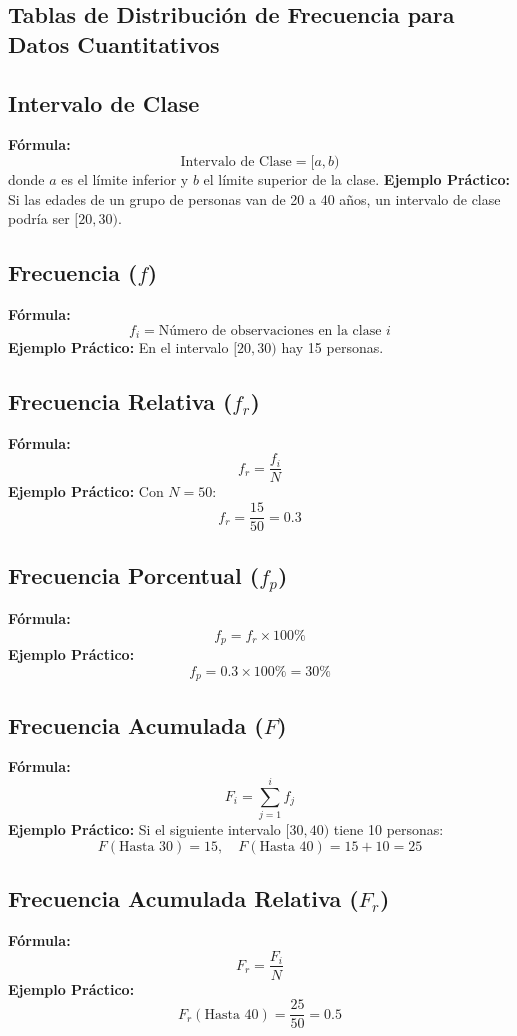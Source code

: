 \documentclass[10pt]{article}
\begin{document}
\begin{multicols}{2}
		\section*{Tablas de Distribución de Frecuencia para Datos Cuantitativos}
		
		\subsection*{Intervalo de Clase}
		\textbf{Fórmula:}
		\[
		\text{Intervalo de Clase} = [a, b)
		\]
		donde \( a \) es el límite inferior y \( b \) el límite superior de la clase.
		\textbf{Ejemplo Práctico:}  
		Si las edades de un grupo de personas van de 20 a 40 años, un intervalo de clase podría ser \([20, 30)\).
		
		\subsection*{Frecuencia ($f$)}
		\textbf{Fórmula:}
		\[
		f_i = \text{Número de observaciones en la clase } i
		\]
		\textbf{Ejemplo Práctico:}  
		En el intervalo \([20, 30)\) hay 15 personas.
		
		\subsection*{Frecuencia Relativa ($f_r$)}
		\textbf{Fórmula:}
		\[
		f_r = \frac{f_i}{N}
		\]
		\textbf{Ejemplo Práctico:}  
		Con \( N = 50 \):
		\[
		f_r = \frac{15}{50} = 0.3
		\]
		
		\subsection*{Frecuencia Porcentual ($f_p$)}
		\textbf{Fórmula:}
		\[
		f_p = f_r \times 100\%
		\]
		\textbf{Ejemplo Práctico:}  
		\[
		f_p = 0.3 \times 100\% = 30\%
		\]
		
		\subsection*{Frecuencia Acumulada ($F$)}
		\textbf{Fórmula:}
		\[
		F_i = \sum_{j=1}^{i} f_j
		\]
		\textbf{Ejemplo Práctico:}  
		Si el siguiente intervalo \([30, 40)\) tiene 10 personas:
		\[
		F(\text{Hasta } 30) = 15, \quad F(\text{Hasta } 40) = 15 + 10 = 25
		\]
		
		\subsection*{Frecuencia Acumulada Relativa ($F_r$)}
		\textbf{Fórmula:}
		\[
		F_r = \frac{F_i}{N}
		\]
		\textbf{Ejemplo Práctico:}  
		\[
		F_r(\text{Hasta } 40) = \frac{25}{50} = 0.5
		\]
		

\end{multicols}
\end{document}
